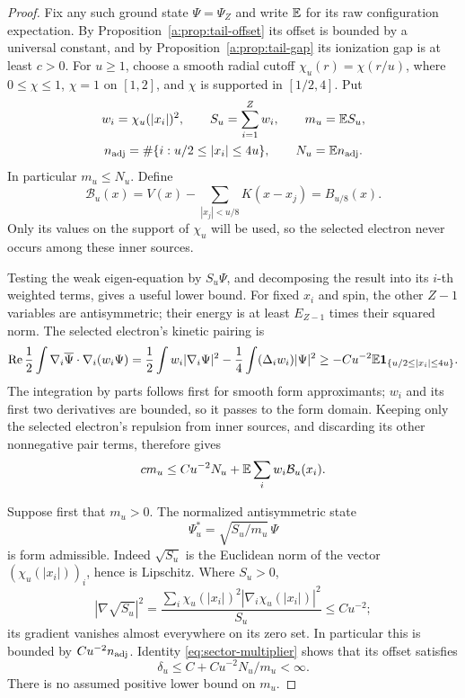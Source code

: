 \begin{proof}
Fix any such ground state $\Psi=\Psi_Z$ and write $\mathbb E$ for its raw
configuration expectation.  By Proposition~\ref{a:prop:tail-offset} its
offset is bounded by a universal constant, and by
Proposition~\ref{a:prop:tail-gap} its ionization gap is at least $c>0$.
For $u\ge1$, choose a smooth radial cutoff $\chi_u(r)=\chi(r/u)$,
where $0\le\chi\le1$, $\chi=1$ on $[1,2]$, and $\chi$ is supported
in $[1/2,4]$.  Put
\[
 \begin{gathered}
 w_i=\chi_u(|x_i|)^2,\qquad
 S_u=\sum_{i=1}^Z w_i,\qquad m_u=\mathbb E S_u,\\
 n_{\rm adj}=\#\{i:u/2\le|x_i|\le4u\},\qquad
 N_u=\mathbb E n_{\rm adj}.
 \end{gathered}
\]
In particular $m_u\le N_u$.  Define
\[
 \mathcal B_u(x)=V(x)-\sum_{|x_j|<u/8}K(x-x_j)
        =B_{u/8}(x).
\]
Only its values on the support of $\chi_u$ will be used, so the
selected electron never occurs among these inner sources.

Testing the weak eigen-equation by $S_u\Psi$, and decomposing the
result into its $i$-th weighted terms, gives a useful lower bound.
For fixed $x_i$ and spin, the other $Z-1$ variables are antisymmetric;
their energy is at least $E_{Z-1}$ times their squared norm.  The
selected electron's kinetic pairing is
\[
 \operatorname{Re}\frac12\int
 \nabla_i\overline\Psi\cdot\nabla_i(w_i\Psi)
 =\frac12\int w_i|\nabla_i\Psi|^2
       -\frac14\int(\Delta_iw_i)|\Psi|^2
 \ge-Cu^{-2}\mathbb E\mathbf 1_{\{u/2\le|x_i|\le4u\}}.
\]
The integration by parts follows first for smooth form approximants;
$w_i$ and its first two derivatives are bounded, so it passes to the
form domain.  Keeping only the selected electron's repulsion from
inner sources, and discarding its other nonnegative pair terms,
therefore gives
\begin{equation}\label{a:eq:tail-weighted}
 c m_u\le C u^{-2}N_u
       +\mathbb E\sum_i w_i \mathcal B_u(x_i).
\end{equation}

Suppose first that $m_u>0$.  The normalized antisymmetric state
\[
 \Psi_u^*=\sqrt{S_u/m_u}\,\Psi
\]
is form admissible.  Indeed $\sqrt{S_u}$ is the Euclidean norm of the
vector $(\chi_u(|x_i|))_i$, hence is Lipschitz.  Where $S_u>0$,
\[
 |\nabla\sqrt{S_u}|^2
 =\frac{\sum_i\chi_u(|x_i|)^2|\nabla_i\chi_u(|x_i|)|^2}{S_u}
 \le C u^{-2};
\]
its gradient vanishes almost everywhere on its zero set.  In
particular this is bounded by $Cu^{-2}n_{\rm adj}$.  Identity
\eqref{eq:sector-multiplier} shows that its offset satisfies
\begin{equation}\label{a:eq:tail-biased-offset}
 \delta_u\le C+Cu^{-2}N_u/m_u<\infty.
\end{equation}
There is no assumed positive lower bound on $m_u$.


\end{proof}
